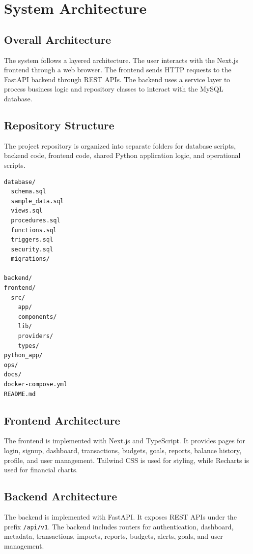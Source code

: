 ﻿\documentclass{article}
\begin{document}
\section{ System Architecture}

\subsection{Overall Architecture}
The system follows a layered architecture. The user interacts with the Next.js frontend through a web browser. The frontend sends HTTP requests to the FastAPI backend through REST APIs. The backend uses a service layer to process business logic and repository classes to interact with the MySQL database.

\subsection{Repository Structure}
The project repository is organized into separate folders for database scripts, backend code, frontend code, shared Python application logic, and operational scripts.

\begin{lstlisting}[style=codestyle, caption={Main repository structure}]
database/
  schema.sql
  sample_data.sql
  views.sql
  procedures.sql
  functions.sql
  triggers.sql
  security.sql
  migrations/

backend/
frontend/
  src/
    app/
    components/
    lib/
    providers/
    types/
python_app/
ops/
docs/
docker-compose.yml
README.md
\end{lstlisting}

\subsection{Frontend Architecture}
The frontend is implemented with Next.js and TypeScript. It provides pages for login, signup, dashboard, transactions, budgets, goals, reports, balance history, profile, and user management. Tailwind CSS is used for styling, while Recharts is used for financial charts.

\subsection{Backend Architecture}
The backend is implemented with FastAPI. It exposes REST APIs under the prefix \texttt{/api/v1}. The backend includes routers for authentication, dashboard, metadata, transactions, imports, reports, budgets, alerts, goals, and user management.
\end{document}
